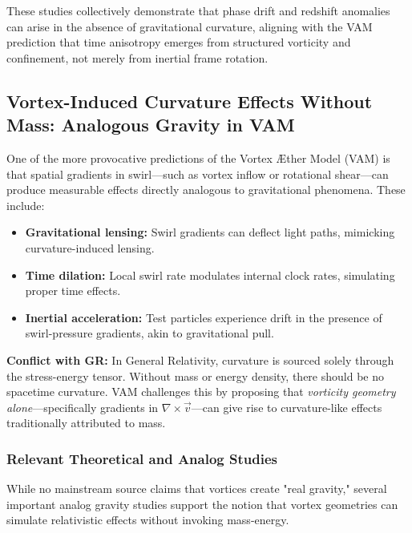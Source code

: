 \documentclass[a4paper, aps,preprint,superscriptaddress, 12pt]{revtex4}
\begin{document}
These studies collectively demonstrate that phase drift and redshift anomalies can arise in the absence of gravitational curvature, aligning with the VAM prediction that time anisotropy emerges from structured vorticity and confinement, not merely from inertial frame rotation.

\subsection{Vortex-Induced Curvature Effects Without Mass: Analogous Gravity in VAM}

One of the more provocative predictions of the Vortex Æther Model (VAM) is that spatial gradients in swirl---such as vortex inflow or rotational shear---can produce measurable effects directly analogous to gravitational phenomena. These include:

\begin{itemize}
    \item \textbf{Gravitational lensing:} Swirl gradients can deflect light paths, mimicking curvature-induced lensing.
    \item \textbf{Time dilation:} Local swirl rate modulates internal clock rates, simulating proper time effects.
    \item \textbf{Inertial acceleration:} Test particles experience drift in the presence of swirl-pressure gradients, akin to gravitational pull.
\end{itemize}

\textbf{Conflict with GR:} In General Relativity, curvature is sourced solely through the stress-energy tensor. Without mass or energy density, there should be no spacetime curvature. VAM challenges this by proposing that \emph{vorticity geometry alone}---specifically gradients in $\nabla \times \vec{v}$---can give rise to curvature-like effects traditionally attributed to mass.

\subsubsection{Relevant Theoretical and Analog Studies}

While no mainstream source claims that vortices create "real gravity," several important analog gravity studies support the notion that vortex geometries can simulate relativistic effects without invoking mass-energy.
\end{document}
